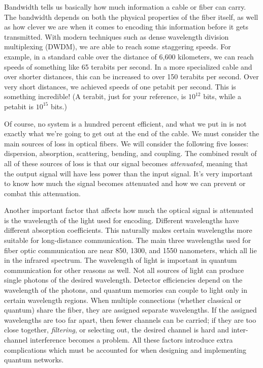 Bandwidth tells us basically how much information a cable or fiber can carry.
The bandwidth depends on both the physical properties of the fiber itself, as well as how clever we are when it comes to encoding this information before it gets transmitted. With modern techniques such as dense wavelength division multiplexing (DWDM), we are able to reach some staggering speeds. For example, in a standard cable over the distance of 6,600 kilometers, we can reach speeds of something like 65 terabits per second. In a more specialized cable and over shorter distances, this can be increased to over 150 terabits per second. Over very short distances, we achieved speeds of one petabit per second. This is something incredible! (A terabit, just for your reference, is $10^{12}$ bits, while a petabit is $10^{15}$ bits.)

Of course, no system is a hundred percent efficient, and what we put in is not exactly what we're going to get out at the end of the cable. We must consider the main sources of loss in optical fibers. We will consider the following five losses: dispersion, absorption, scattering, bending, and coupling. The combined result of all of these sources of loss is that our signal becomes \emph{attenuated}, meaning that the output signal will have less power than the input signal. It's very important to know how much the signal becomes attenuated and how we can prevent or combat this attenuation.

Another important factor that affects how much the optical signal is attenuated is the wavelength of the light used for encoding.
Different wavelengths have different absorption coefficients.
This naturally makes certain wavelengths more suitable for long-distance communication.
The main three wavelengths used for fiber optic communication are near 850, 1300, and 1550 nanometers, which all lie in the infrared spectrum.
The wavelength of light is important in quantum communication for other reasons as well.
Not all sources of light can produce single photons of the desired wavelength. Detector efficiencies depend on the wavelength of the photons, and quantum memories can couple to light only in certain wavelength regions. When multiple connections (whether classical or quantum) share the fiber, they are assigned separate wavelengths. If the assigned wavelengths are too far apart, then fewer channels can be carried; if they are too close together, \emph{filtering}, or selecting out, the desired channel is hard and inter-channel interference becomes a problem. 
All these factors introduce extra complications which must be accounted for when designing and implementing quantum networks.

